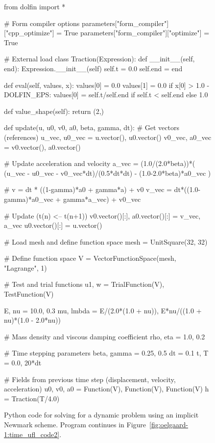 \begin{figure}
\begin{python}
from dolfin import *

# Form compiler options
parameters["form_compiler"]["cpp_optimize"] = True
parameters["form_compiler"]["optimize"] = True

# External load
class Traction(Expression):
    def __init__(self, end):
        Expression.__init__(self)
        self.t = 0.0
        self.end = end

    def eval(self, values, x):
        values[0] = 0.0
        values[1] = 0.0
        if x[0] > 1.0 - DOLFIN_EPS:
            values[0] = self.t/self.end if self.t < self.end else 1.0

    def value_shape(self):
        return (2,)

def update(u, u0, v0, a0, beta, gamma, dt):
    # Get vectors (references)
    u_vec, u0_vec  = u.vector(), u0.vector()
    v0_vec, a0_vec = v0.vector(), a0.vector()

    # Update acceleration and velocity
    a_vec = (1.0/(2.0*beta))*( (u_vec - u0_vec - v0_vec*dt)/(0.5*dt*dt) - (1.0-2.0*beta)*a0_vec )

    # v = dt * ((1-gamma)*a0 + gamma*a) + v0
    v_vec = dt*((1.0-gamma)*a0_vec + gamma*a_vec) + v0_vec

    # Update (t(n) <-- t(n+1))
    v0.vector()[:], a0.vector()[:] = v_vec, a_vec
    u0.vector()[:] = u.vector()

# Load mesh and define function space
mesh = UnitSquare(32, 32)

# Define function space
V = VectorFunctionSpace(mesh, "Lagrange", 1)

# Test and trial functions
u1, w = TrialFunction(V), TestFunction(V)

E, nu  = 10.0, 0.3
mu, lmbda = E/(2.0*(1.0 + nu)), E*nu/((1.0 + nu)*(1.0 - 2.0*nu))

# Mass density and viscous damping coefficient
rho, eta = 1.0, 0.2

# Time stepping parameters
beta, gamma = 0.25, 0.5
dt   = 0.1
t, T = 0.0, 20*dt

# Fields from previous time step (displacement, velocity, acceleration)
u0, v0, a0 = Function(V), Function(V), Function(V)
h = Traction(T/4.0)
\end{python}
\caption{Python code for solving for a dynamic
problem using an implicit Newmark scheme. Program continues in
Figure~\ref{fig:oelgaard-1:time_ufl_code2}.}
\label{fig:oelgaard-1:time_ufl_code}
\end{figure}

